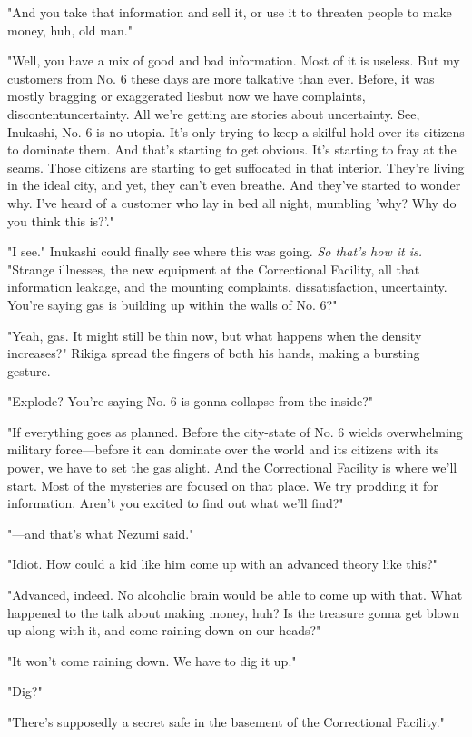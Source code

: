 "And you take that information and sell it, or use it to threaten people
to make money, huh, old man."

"Well, you have a mix of good and bad information. Most of it is
useless. But my customers from No. 6 these days are more talkative than
ever. Before, it was mostly bragging or exaggerated lies\el but now we
have complaints, discontent\el uncertainty. All we're getting are
stories about uncertainty. See, Inukashi, No. 6 is no utopia. It's only
trying to keep a skilful hold over its citizens to dominate them. And
that's starting to get obvious. It's starting to fray at the seams.
Those citizens are starting to get suffocated in that interior. They're
living in the ideal city, and yet, they can't even breathe. And they've
started to wonder why. I've heard of a customer who lay in bed all
night, mumbling 'why? Why do you think this is?'."

"I see." Inukashi could finally see where this was going. \emph{So that's how
it is.} "Strange illnesses, the new equipment at the Correctional
Facility, all that information leakage, and the mounting complaints,
dissatisfaction, uncertainty. You're saying gas is building up within
the walls of No. 6?"

"Yeah, gas. It might still be thin now, but what happens when the
density increases?" Rikiga spread the fingers of both his hands, making
a bursting gesture.

"Explode? You're saying No. 6 is gonna collapse from the inside?"

"If everything goes as planned. Before the city-state of No. 6 wields
overwhelming military force---before it can dominate over the world and
its citizens with its power, we have to set the gas alight. And the
Correctional Facility is where we'll start. Most of the mysteries are
focused on that place. We try prodding it for information. Aren't you
excited to find out what we'll find?"

"---and that's what Nezumi said."

"Idiot. How could a kid like him come up with an advanced theory like
this?"

"Advanced, indeed. No alcoholic brain would be able to come up with
that. What happened to the talk about making money, huh? Is the treasure
gonna get blown up along with it, and come raining down on our heads?"

"It won't come raining down. We have to dig it up."

"Dig?"

"There's supposedly a secret safe in the basement of the Correctional
Facility."


